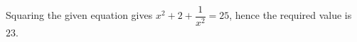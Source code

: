 Squaring the given equation gives $x^2+2+\dfrac{1}{x^2}=25$, hence the required value is $\boxed{23}$.
